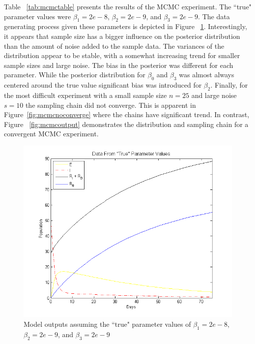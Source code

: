 \documentclass[10pt,a4paper]{article}
\begin{document}
Table ~\ref{tab:mcmctable} presents the results of the MCMC experiment. The ``true" parameter values were $\beta_1=2e-8$, $\beta_2=2e-9$, and $\beta_3=2e-9$. The data generating process given these parameters is depicted in Figure ~\ref{fig:mcmctrue}. Interestingly, it appears that sample size has a bigger influence on the posterior distribution than the amount of noise added to the sample data. The variances of the distribution appear to be stable, with a somewhat increasing trend for smaller sample sizes and large noise. The bias in the posterior was different for each parameter. While the posterior distribution for $\beta_0$ and $\beta_3$ was almost always centered around the true value significant bias was introduced for $\beta_2$. Finally, for the most difficult experiment with a small sample size $n=25$ and large noise $s=10$ the sampling chain did not converge. This is apparent in Figure~\ref{fig:mcmcnoconverge} where the chains have significant trend. In contrast, Figure ~\ref{fig:mcmcoutput} demonstrates the distribution and sampling chain for a convergent MCMC experiment.

\begin{figure}
\centering
\includegraphics[scale=0.6]{truth}
\caption{Model outputs assuming the ``true" parameter values of $\beta_1=2e-8$, $\beta_2=2e-9$, and $\beta_3=2e-9$}
\label{fig:mcmctrue}
\end{figure}
\end{document}

